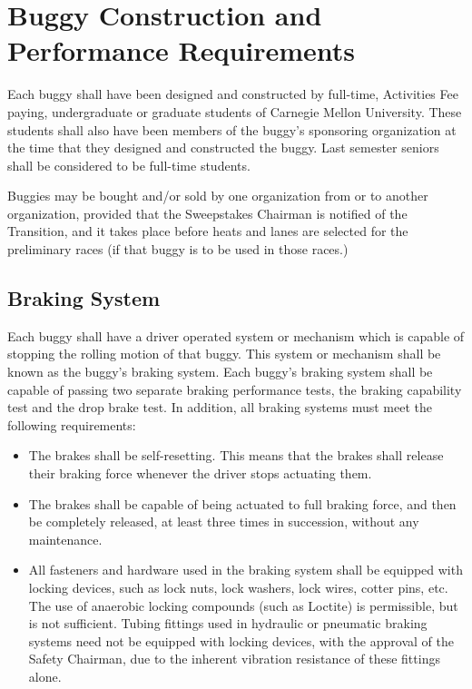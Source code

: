 \chapter{Buggy Construction and Performance Requirements}

	Each buggy shall have been designed and constructed by full-time,
	Activities Fee paying, undergraduate or graduate students of Carnegie Mellon
	University. These students shall also have been members of the buggy's
	sponsoring organization at the time that they designed and constructed the
	buggy. Last semester seniors shall be considered to be full-time students.

	Buggies may be bought and/or sold by one organization from or to another
	organization, provided that the Sweepstakes Chairman is notified of the
	Transition, and it takes place before heats and lanes are selected for the
	preliminary races (if that buggy is to be used in those races.)

\section{Braking System}

	Each buggy shall have a driver operated system or mechanism which is capable of
	stopping the rolling motion of that buggy. This system or mechanism shall be
	known as the buggy's braking system. Each buggy's braking system shall be
	capable of passing two separate braking performance tests, the braking
	capability test and the drop brake test. In addition, all braking systems must
	meet the following requirements:

	\begin{itemize}

		\item
		The brakes shall be self-resetting. This means that the brakes shall release
		their braking force whenever the driver stops actuating them.

		\item
		The brakes shall be capable of being actuated to full braking force, and then
		be completely released, at least three times in succession, without any
		maintenance.

		\item
		All fasteners and hardware used in the braking system shall be equipped with
		locking devices, such as lock nuts, lock washers, lock wires, cotter pins, etc.
		The use of anaerobic locking compounds (such as Loctite) is permissible, but is
		not sufficient. Tubing fittings used in hydraulic or pneumatic braking systems
		need not be equipped with locking devices, with the approval of the Safety
		Chairman, due to the inherent vibration resistance of these fittings alone.

	\end{itemize}

